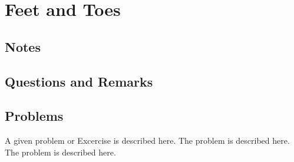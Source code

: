 %
%
%
\chapter{Feet and Toes}
\label{Feet} %








\abstract{}


\section{Notes}
\label{sec:NOTE22}

\section{Questions and Remarks}
\label{sec:QR22}






%
%
%


\section*{Problems}
%
\begin{prob}
\label{prob1}
A given problem or Excercise is described here. The
problem is described here. The problem is described here.
\end{prob}



